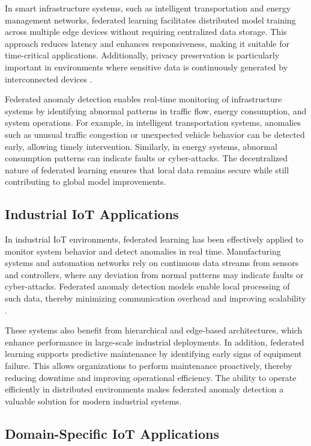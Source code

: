 \documentclass[12pt]{article}
\begin{document}
In smart infrastructure systems, such as intelligent transportation and energy management networks, federated learning facilitates distributed model training across multiple edge devices without requiring centralized data storage. This approach reduces latency and enhances responsiveness, making it suitable for time-critical applications. Additionally, privacy preservation is particularly important in environments where sensitive data is continuously generated by interconnected devices \cite{paper1,paper2}.

Federated anomaly detection enables real-time monitoring of infrastructure systems by identifying abnormal patterns in traffic flow, energy consumption, and system operations. For example, in intelligent transportation systems, anomalies such as unusual traffic congestion or unexpected vehicle behavior can be detected early, allowing timely intervention. Similarly, in energy systems, abnormal consumption patterns can indicate faults or cyber-attacks. The decentralized nature of federated learning ensures that local data remains secure while still contributing to global model improvements.

\subsection{Industrial IoT Applications}

In industrial IoT environments, federated learning has been effectively applied to monitor system behavior and detect anomalies in real time. Manufacturing systems and automation networks rely on continuous data streams from sensors and controllers, where any deviation from normal patterns may indicate faults or cyber-attacks. Federated anomaly detection models enable local processing of such data, thereby minimizing communication overhead and improving scalability \cite{paper3,paper4}.

These systems also benefit from hierarchical and edge-based architectures, which enhance performance in large-scale industrial deployments. In addition, federated learning supports predictive maintenance by identifying early signs of equipment failure. This allows organizations to perform maintenance proactively, thereby reducing downtime and improving operational efficiency. The ability to operate efficiently in distributed environments makes federated anomaly detection a valuable solution for modern industrial systems.

\subsection{Domain-Specific IoT Applications}
\end{document}
